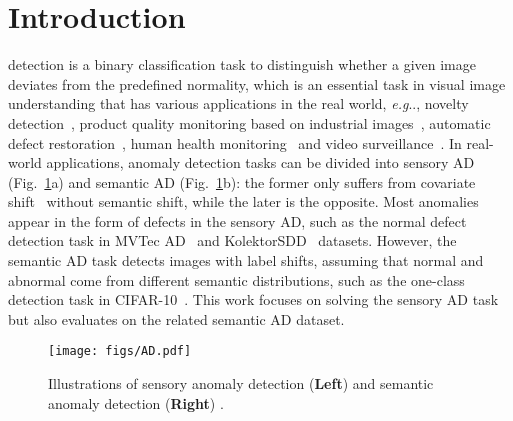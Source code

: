 \documentclass[lettersize,journal]{IEEEtran}
\makeatletter
\DeclareRobustCommand\onedot{\futurelet\@let@token\@onedot}
\def\@onedot{\ifx\@let@token.\else.\null\fi\xspace}
\def\eg{\emph{e.g}\onedot} \def\Eg{\emph{E.g}\onedot}
\makeatother
\begin{document}
\section{Introduction}\label{sec:introduction}
 detection is a binary classification task to distinguish whether a given image deviates from the predefined normality, which is an essential task in visual image understanding that has various applications in the real world, \eg, novelty detection~\cite{nilsback2008automated}, product quality monitoring based on industrial images~\cite{bergmann2019mvtec}, automatic defect restoration~\cite{wang2012archive}, human health monitoring~\cite{li2018thoracic} and video surveillance~\cite{liu2018classifier,sultani2018real,lv2021localizing,jardim2019domain}. In real-world applications, anomaly detection tasks can be divided into sensory AD (Fig.~\ref{fig:AD}a) and semantic AD (Fig.~\ref{fig:AD}b): the former only suffers from covariate shift~\cite{yang2021generalized} without semantic shift, while the later is the opposite. Most anomalies appear in the form of defects in the sensory AD, such as the normal defect detection task in MVTec AD~\cite{bergmann2019mvtec} and KolektorSDD~\cite{Tabernik2019JIM} datasets. However, the semantic AD task detects images with label shifts, assuming that normal and abnormal come from different semantic distributions, such as the one-class detection task in CIFAR-10~\cite{krizhevsky2009learning}. This work focuses on solving the sensory AD task but also evaluates on the related semantic AD dataset.
\begin{figure}[t]
    \centering
    \texttt{[image: figs/AD.pdf]}
    \caption{Illustrations of sensory anomaly detection (\textbf{Left}) and semantic anomaly detection (\textbf{Right}) .}
    \label{fig:AD}
\end{figure}
\end{document}
